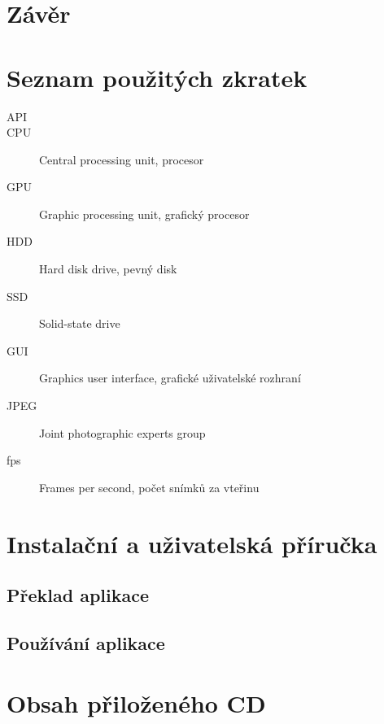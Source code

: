 \documentclass[11pt,twoside,a4paper]{book}
\begin{document}
\chapter{Závěr}
\label{chap:end}


\renewcommand\refname{Zdroje}

\def\CS{$\cal C\kern-0.1667em\lower.5ex\hbox{$\cal S$}\kern-0.075em $}



\appendix


\chapter{Seznam použitých zkratek}

\begin{description}
\item[API]
\item[CPU] Central processing unit, procesor
\item[GPU] Graphic processing unit, grafický procesor
\item[HDD] Hard disk drive, pevný disk
\item[SSD] Solid-state drive
\item[GUI] Graphics user interface, grafické uživatelské rozhraní
\item[JPEG]  Joint photographic experts group
\item[fps]  Frames per second, počet snímků za vteřinu
\end{description}

\chapter{Instalační a uživatelská příručka}
\label{chap:install}

\section{Překlad aplikace}
\section{Používání aplikace}

\chapter{Obsah přiloženého CD}
\end{document}
